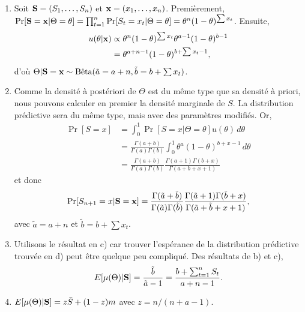 \begin{exercice}
\begin{sol}
\begin{enumerate}
    \item Soit $\mathbf{S} = (S_1, \dots, S_n)$ et $\mathbf{x} = (x_1,
      \dots, x_n)$. Premièrement, $\Pr[\mathbf{S} = \mathbf{x}|\Theta =
      \theta] = \prod_{t=1}^n \Pr[S_t = x_t|\Theta = \theta] =
      \theta^n (1 - \theta)^{\sum x_t}$.  Ensuite,
      \begin{align*}
        u(\theta|\mathbf{x})
        &\propto \theta^n (1 - \theta)^{\sum x_t}
        \theta^{a - 1} (1 - \theta)^{b - 1} \\
        &= \theta^{a + n - 1}(1 - \theta)^{b + \sum x_t - 1},
      \end{align*}
      d'où $\Theta|\mathbf{S} = \mathbf{x} \sim \text{Bêta}(\tilde{a} =
      a + n, \tilde{b} = b + \sum x_t)$.
    \item Comme la densité à postériori de $\Theta$ est du même type
      que sa densité à priori, nous pouvons calculer en premier la
      densité marginale de $S$. La distribution prédictive sera du
      même type, mais avec des paramètres modifiés. Or,
      \begin{align*}
        \Pr[S = x]
        &= \int_0^1 \Pr[S = x|\Theta = \theta] u(\theta)\, d\theta \\
        &= \frac{\Gamma(a + b)}{\Gamma(a) \Gamma(b)}
        \int_0^1 \theta^a (1 - \theta)^{b + x - 1}\, d\theta
        \\
        &= \frac{\Gamma(a + b)}{\Gamma(a) \Gamma(b)}
        \frac{\Gamma(a + 1) \Gamma(b + x)}{\Gamma(a +
          b +x + 1)}
      \end{align*}
      et donc
      \begin{equation*}
        \Pr[S_{n+1}=x|\mathbf{S}=\mathbf{x}] =
        \frac{\Gamma(\tilde{a} + \tilde{b})}
        {\Gamma(\tilde{a}) \Gamma(\tilde{b})}
        \frac{\Gamma(\tilde{a} + 1) \Gamma(\tilde{b} + x)}
        {\Gamma(\tilde{a} + \tilde{b} +x + 1)},
      \end{equation*}
      avec $\tilde{a} = a + n$ et $\tilde{b} = b +
      \sum x_t$.
    \item Utilisons le résultat en c) car trouver l'espérance de la
      distribution prédictive trouvée en d) peut être quelque peu
      compliqué. Des résultats de b) et c),
      \begin{equation*}
        E [ \mu(\Theta)|\mathbf{S} ] =
        \frac{\tilde{b}}{\tilde{a} - 1} =
        \frac{b + \sum_{t = 1}^n S_t}{a + n - 1}.
      \end{equation*}
    \item $E [ \mu(\Theta)|\mathbf{S} ] = z \bar{S} + (1 - z) m$ avec $z
      = n/(n + a - 1)$.
    \end{enumerate}
  \end{sol}
\end{exercice}

